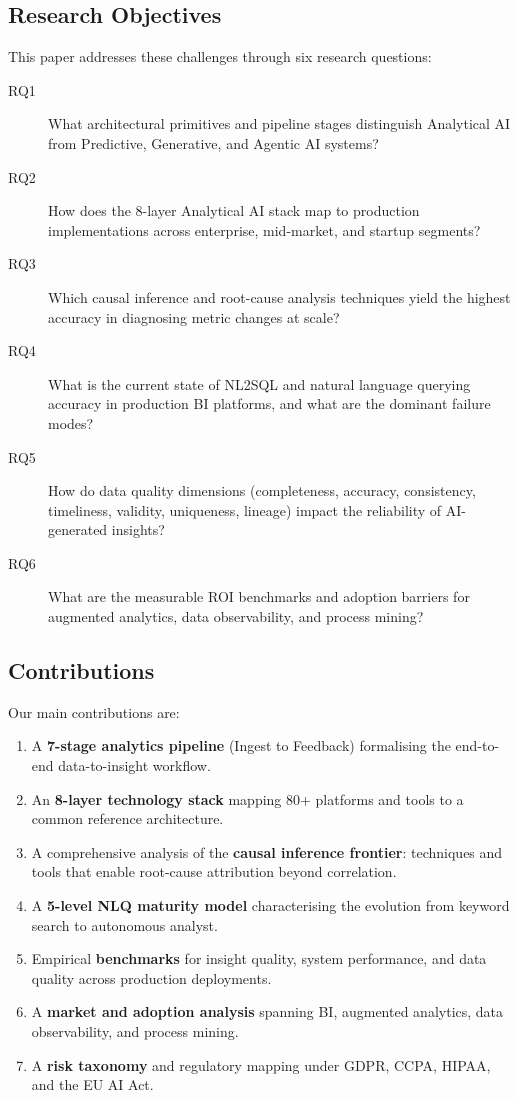 \documentclass[12pt, a4paper]{article}
\begin{document}
\subsection{Research Objectives}
This paper addresses these challenges through six research questions:

\begin{description}
    \item[RQ1] What architectural primitives and pipeline stages distinguish Analytical AI from Predictive, Generative, and Agentic AI systems?
    \item[RQ2] How does the 8-layer Analytical AI stack map to production implementations across enterprise, mid-market, and startup segments?
    \item[RQ3] Which causal inference and root-cause analysis techniques yield the highest accuracy in diagnosing metric changes at scale?
    \item[RQ4] What is the current state of NL2SQL and natural language querying accuracy in production BI platforms, and what are the dominant failure modes?
    \item[RQ5] How do data quality dimensions (completeness, accuracy, consistency, timeliness, validity, uniqueness, lineage) impact the reliability of AI-generated insights?
    \item[RQ6] What are the measurable ROI benchmarks and adoption barriers for augmented analytics, data observability, and process mining?
\end{description}

\subsection{Contributions}
Our main contributions are:
\begin{enumerate}
    \item A \textbf{7-stage analytics pipeline} (Ingest to Feedback) formalising the end-to-end data-to-insight workflow.
    \item An \textbf{8-layer technology stack} mapping 80+ platforms and tools to a common reference architecture.
    \item A comprehensive analysis of the \textbf{causal inference frontier}: techniques and tools that enable root-cause attribution beyond correlation.
    \item A \textbf{5-level NLQ maturity model} characterising the evolution from keyword search to autonomous analyst.
    \item Empirical \textbf{benchmarks} for insight quality, system performance, and data quality across production deployments.
    \item A \textbf{market and adoption analysis} spanning BI, augmented analytics, data observability, and process mining.
    \item A \textbf{risk taxonomy} and regulatory mapping under GDPR, CCPA, HIPAA, and the EU AI Act.
\end{enumerate}
\end{document}
